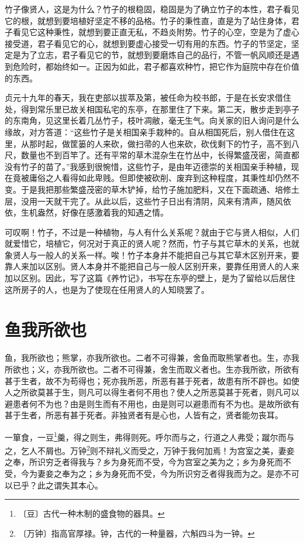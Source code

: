 \documentclass[12pt,UTF-8,openany,a4]{ctexbook}
\begin{document}
\begin{large}\yiwen
    
    竹子像贤人，这是为什么？竹子的根稳固，稳固是为了确立竹子的本性，君子看见它的根，就想到要培植好坚定不移的品格。竹子的秉性直，直是为了站住身体，君子看见它这种秉性，就想到要正直无私，不趋炎附势。竹子的心空，空是为了虚心接受道，君子看见它的心，就想到要虚心接受一切有用的东西。竹子的节坚定，坚定是为了立志，君子看见它的节，就想到要磨炼自己的品行，不管一帆风顺还是遇到危险时，都始终如一。正因为如此，君子都喜欢种竹，把它作为庭院中存在价值的东西。
    
    贞元十九年的春天，我在吏部以拔萃及第，被任命为校书郎，于是在长安求借住处，得到常乐里已故关相国私宅的东亭，在那里住了下来。第二天，散步走到亭子的东南角，见这里长着几丛竹子，枝叶凋敝，毫无生气。向关家的旧人询问是什么缘故，对方答道：“这些竹子是关相国亲手栽种的。自从相国死后，别人借住在这里，从那时起，做筐篓的人来砍，做扫帚的人也来砍，砍伐剩下的竹子，高不到八尺，数量也不到百竿了。还有平常的草木混杂生在竹丛中，长得繁盛茂密，简直都没有竹子的苗了。”我感到很惋惜，这些竹子，是由年迈德崇的关相国亲手种植，现在竟被庸俗之人看得如此卑贱。但即使被砍削、废弃到这种程度，其秉性却仍然不变。于是我把那些繁盛茂密的草木铲掉，给竹子施加肥料，又在下面疏通、培修土层，没用一天就干完了。从此以后，这些竹子日出有清阴，风来有清声，随风依依，生机盎然，好像在感激着我的知遇之情。
    
    可叹啊！竹子，不过是一种植物，与人有什么关系呢？就由于它与贤人相似，人们就爱惜它，培植它，何况对于真正的贤人呢？然而，竹子与其它草木的关系，也就象贤人与一般人的关系一样。唉！竹子本身并不能把自己与其它草木区别开来，要靠人来加以区别。贤人本身并不能把自己与一般人区别开来，要靠任用贤人的人来加以区别。因此，写了这篇《养竹记》，书写在东亭的壁上，是为了留给以后居住这所房子的人，也是为了使现在任用贤人的人知晓罢了。
    

\end{large}



\chapter{鱼我所欲也}

\begin{large}
    
    鱼，我所欲也；熊掌，亦我所欲也。二者不可得兼，舍鱼而取熊掌者也。生，亦我所欲也；义，亦我所欲也。二者不可得兼，舍生而取义者也。生亦我所欲，所欲有甚于生者，故不为苟得也；死亦我所恶，所恶有甚于死者，故患有所不辟也。如使人之所欲莫甚于生，则凡可以得生者何不用也？使人之所恶莫甚于死者，则凡可以避患者何不为也？由是则生而有不用也，由是则可以避患而有不为也。是故所欲有甚于生者，所恶有甚于死者。非独贤者有是心也，人皆有之，贤者能勿丧耳。
    
    一箪食，一豆\footnote{〔豆〕\yiwen 古代一种木制的盛食物的器具。}羹，得之则生，弗得则死。呼尔而与之，行道之人弗受；蹴尔而与之，乞人不屑也。万钟\footnote{〔万钟〕\yiwen 指高官厚禄。钟，古代的一种量器，六斛四斗为一钟。}则不辩礼义而受之，万钟于我何加焉！为宫室之美，妻妾之奉，所识穷乏者得我与？乡为身死而不受，今为宫室之美为之；乡为身死而不受，今为妻妾之奉为之；乡为身死而不受，今为所识穷乏者得我而为之。是亦不可以已乎？此之谓失其本心。

\end{large}
\end{document}
